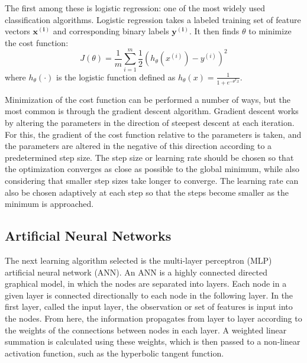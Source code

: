 The first among these is logistic regression: one of the most widely used classification algorithms.
Logistic regression takes a labeled training set of feature vectors $\mathbf{x^{(i)}}$ and corresponding binary labels $\mathbf{y^{(i)}}$.
It then finds $\theta$ to minimize the cost function:
\begin{equation}
J(\theta) = \frac{1}{m} \sum_{i=1}^m\frac{1}{2} \left( h_\theta \left( x^{(i)} \right) - y^{(i)} \right)^2
\end{equation}
where $h_\theta (\cdot)$ is the logistic function defined as $h_\theta(x) = \frac{1}{1+e^{-\theta^Tx}}$.

Minimization of the cost function can be performed a number of ways, but the most common is through the gradient descent algorithm.
Gradient descent works by altering the parameters in the direction of steepest descent at each iteration.
For this, the gradient of the cost function relative to the parameters is taken, and the parameters are altered in the negative of this direction according to a predetermined step size.
The step size or learning rate should be chosen so that the optimization converges as close as possible to the global minimum, while also considering that smaller step sizes take longer to converge.
The learning rate can also be chosen adaptively at each step so that the steps become smaller as the minimum is approached.

\subsection{Artificial  Neural Networks}

The next learning algorithm selected is the multi-layer perceptron (MLP) artificial neural network (ANN).
An ANN is a highly connected directed graphical model, in which the nodes are separated into layers.
Each node in a given layer is connected directionally to each node in the following layer.
In the first layer, called the input layer, the observation or set of features is input into the nodes.
From here, the information propagates from layer to layer according to the weights of the connections between nodes in each layer.
A weighted linear summation is calculated using these weights, which is then passed to a non-linear activation function, such as the hyperbolic tangent function.


